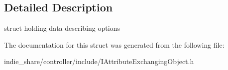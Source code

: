 \subsection{Detailed Description}
struct holding data describing options 

The documentation for this struct was generated from the following file\+:\begin{DoxyCompactItemize}
\item 
indie\+\_\+share/controller/include/I\+Attribute\+Exchanging\+Object.\+h\end{DoxyCompactItemize}
